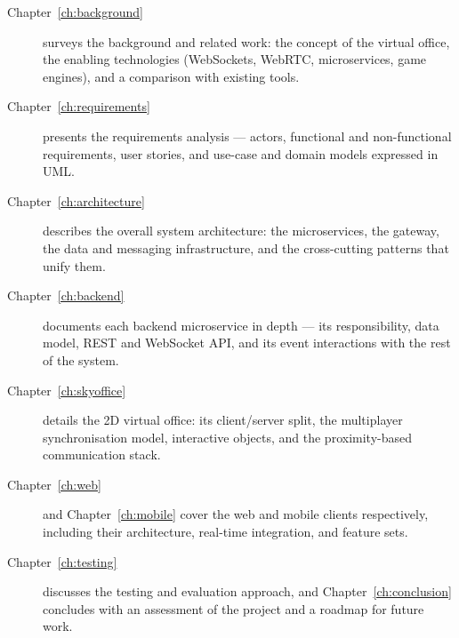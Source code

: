 \begin{description}
  \item[Chapter~\ref{ch:background}] surveys the background and related work: the
  concept of the virtual office, the enabling technologies (WebSockets, WebRTC,
  microservices, game engines), and a comparison with existing tools.

  \item[Chapter~\ref{ch:requirements}] presents the requirements analysis ---
  actors, functional and non-functional requirements, user stories, and use-case
  and domain models expressed in UML.

  \item[Chapter~\ref{ch:architecture}] describes the overall system
  architecture: the microservices, the gateway, the data and messaging
  infrastructure, and the cross-cutting patterns that unify them.

  \item[Chapter~\ref{ch:backend}] documents each backend microservice in
  depth --- its responsibility, data model, REST and WebSocket API, and its
  event interactions with the rest of the system.

  \item[Chapter~\ref{ch:skyoffice}] details the 2D virtual office: its
  client/server split, the multiplayer synchronisation model, interactive
  objects, and the proximity-based communication stack.

  \item[Chapter~\ref{ch:web}] and Chapter~\ref{ch:mobile} cover the web and
  mobile clients respectively, including their architecture, real-time
  integration, and feature sets.

  \item[Chapter~\ref{ch:testing}] discusses the testing and evaluation
  approach, and Chapter~\ref{ch:conclusion} concludes with an assessment of the
  project and a roadmap for future work.
\end{description}
